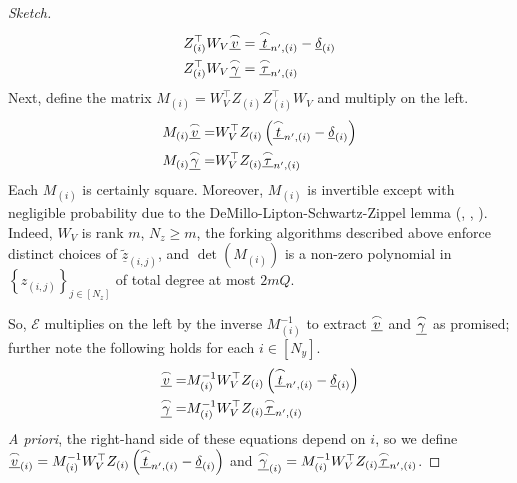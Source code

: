 \documentclass{article}
\theoremstyle{definition}
\newcommand{\zq}{\widetilde{\underline{z}}}
\begin{document}
\begin{proof}[Sketch]
\begin{align*}
    Z^\top_{(i)} W_V\underline{\overset{\LARGE \frown}{\small{v}}} &= \underline{\overset{\LARGE \frown}{\small{t}}}_{n^\prime, (i)} - \underline{\delta}_{(i)} \\
    Z^\top_{(i)} W_V\underline{\overset{\LARGE \frown}{\small{\gamma}}} &= \underline{\overset{\LARGE \frown}{\small{\tau}}}_{n^\prime, (i)} 
\end{align*}
Next, define the matrix $M_{(i)} = W_V^\top Z_{(i)}Z^\top_{(i)} W_V$ and multiply on the left.
\begin{align*}
M_{(i)}\underline{\overset{\LARGE \frown}{\small{v}}} =& W_V^\top Z_{(i)}\left(\underline{\overset{\LARGE \frown}{\small{t}}}_{n^\prime, (i)} - \underline{\delta}_{(i)}\right) \\
M_{(i)}\underline{\overset{\LARGE \frown}{\small{\gamma}}} =& W_V^\top Z_{(i)}\underline{\overset{\LARGE \frown}{\small{\tau}}}_{n^\prime, (i)} 
\end{align*}
Each $M_{(i)}$ is certainly square. Moreover, $M_{(i)}$ is invertible except with negligible probability due to the DeMillo-Lipton-Schwartz-Zippel lemma (\cite{demillo1977probabilistic}, \cite{zippel1979probabilistic}, \cite{schwartz1980fast}). Indeed, $W_V$ is rank $m$, $N_z \geq m$, the forking algorithms described above enforce distinct choices of $\zq_{(i,j)}$, and $\det(M_{(i)})$ is a non-zero polynomial in $\left\{z_{(i,j)}\right\}_{j \in [N_z]}$ of total degree at most $2mQ$.



So, $\mathcal{E}$ multiplies on the left by the inverse $M^{-1}_{(i)}$ to extract $\underline{\overset{\LARGE \frown}{\small{v}}}$ and $\underline{\overset{\LARGE \frown}{\small{\gamma}}}$ as promised; further note the following holds for each $i \in [N_y]$.
\begin{align*} 
\underline{\overset{\LARGE \frown}{\small{v}}} =& M^{-1}_{(i)}W_V^\top Z_{(i)}\left(\underline{\overset{\LARGE \frown}{\small{t}}}_{n^\prime, (i)} - \underline{\delta}_{(i)}\right) \\
\underline{\overset{\LARGE \frown}{\small{\gamma}}} =& M^{-1}_{(i)}W_V^\top Z_{(i)}\underline{\overset{\LARGE \frown}{\small{\tau}}}_{n^\prime, (i)}
\end{align*}
\textit{A priori}, the right-hand side of these equations depend on $i$, so we define $\underline{\overset{\LARGE \frown}{\small{v}}}_{(i)} = M^{-1}_{(i)}W_V^\top Z_{(i)}\left(\underline{\overset{\LARGE \frown}{\small{t}}}_{n^\prime, (i)} - \underline{\delta}_{(i)}\right)$ and $\underline{\overset{\LARGE \frown}{\small{\gamma}}}_{(i)} = M^{-1}_{(i)}W_V^\top Z_{(i)}\underline{\overset{\LARGE \frown}{\small{\tau}}}_{n^\prime, (i)}$. 


\end{proof}
\end{document}
